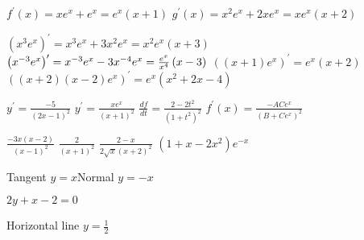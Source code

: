 \begin{Answer}[ref={exPQCRules}]
	\Question %
\begin{tasks}
	\task $f^{ \prime } \left (x\right ) =x e^{x} +e^{x} =e^{x} \left (x +1\right )$ 
	\task $g^{ \prime } \left (x\right ) =x^{2} e^{x} +2 x e^{x} =x e^{x} \left (x +2\right )$ 
\end{tasks}

\Question %
\begin{tasks}
	\task $\left (x^{3} e^{x}\right )^{ \prime } =x^{3} e^{x} +3 x^{2} e^{x} =x^{2} e^{x} \left (x +3\right )$
	\task $\left (x^{ -3} e^{x}\right )^{ \prime } =x^{ -3} e^{x} -3 x^{ -4} e^{x}\\
	 =\frac{e^{x}}{x^{4}} \left (x -3\right )$ 
	\task $\left (\left (x +1\right ) e^{x}\right )^{ \prime } =e^{x} \left (x +2\right )$
	\task $\left (\left (x +2\right ) \left (x -2\right ) e^{x}\right )^{ \prime } =e^{x} \left (x^{2} +2 x -4\right )$
\end{tasks}

\Question %
\begin{tasks}
	\task $y^{ \prime } =\frac{ -5}{\left (2 x -1\right )^{2}}$ 
	\task $y^{ \prime } =\frac{x e^{x}}{\left (x +1\right )^{2}}$ 
	\task $\frac{d f}{d t} =\frac{2 -2 t^{2}}{\left (1 +t^{2}\right )^{2}}$ 
	\task $f^{ \prime } \left (x\right ) =\frac{ -A C e^{x}}{\left (B +C e^{x}\right )^{2}}$ 
\end{tasks}

\Question %
\begin{tasks}
	\task $\frac{ -3 x \left (x -2\right )}{\left (x -1\right )^{2}}$ 
	\task $\frac{2}{\left (x +1\right )^{2}}$	
	\task $\frac{2 -x}{2 \sqrt{x} \left (x +2\right )^{2}}$ 
	\task $\left (1 +x -2 x^{2}\right ) e^{ -x}$ 
\end{tasks}

\Question %
Tangent $y =x$\qquad Normal $y = -x$
\Question %
\begin{tasks}
	\task  %
	$2 y +x -2 =0$
	\task  %
\end{tasks}
\Question %
\begin{tasks}
	\task  %
	Horizontal line $y =\frac{1}{2}$
	\task  %
\end{tasks}


\end{Answer}
